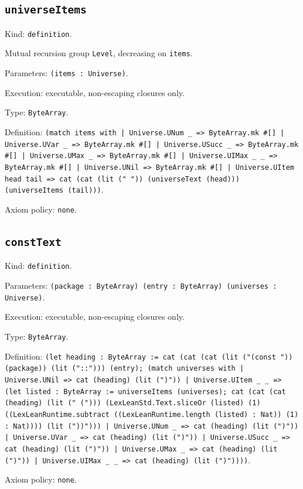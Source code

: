 \documentclass[11pt]{article}
\begin{document}
\subsection*{\texttt{universeItems}}
\noindent Kind: \texttt{definition}.\par
\noindent Mutual recursion group \texttt{Level}, decreasing on \texttt{items}.\par
\noindent Parameters: \texttt{(items : Universe)}.\par
\noindent Execution: executable, non-escaping closures only.\par
\noindent Type: \texttt{ByteArray}.\par
\noindent Definition: \texttt{(match items with | Universe.UNum \_ => ByteArray.mk \#[] | Universe.UVar \_ => ByteArray.mk \#[] | Universe.USucc \_ => ByteArray.mk \#[] | Universe.UMax \_ => ByteArray.mk \#[] | Universe.UIMax \_ \_ => ByteArray.mk \#[] | Universe.UNil => ByteArray.mk \#[] | Universe.UItem head tail => cat (cat (lit (" ")) (universeText (head))) (universeItems (tail)))}.\par
\noindent Axiom policy: \texttt{none}.\par
\subsection*{\texttt{constText}}
\noindent Kind: \texttt{definition}.\par
\noindent Parameters: \texttt{(package : ByteArray) (entry : ByteArray) (universes : Universe)}.\par
\noindent Execution: executable, non-escaping closures only.\par
\noindent Type: \texttt{ByteArray}.\par
\noindent Definition: \texttt{(let heading : ByteArray := cat (cat (cat (lit ("(const ")) (package)) (lit ("::"))) (entry); (match universes with | Universe.UNil => cat (heading) (lit (")")) | Universe.UItem \_ \_ => (let listed : ByteArray := universeItems (universes); cat (cat (cat (heading) (lit (" ("))) (LexLeanStd.Text.sliceOr (listed) (1) ((LexLeanRuntime.subtract ((LexLeanRuntime.length (listed) : Nat)) (1) : Nat)))) (lit ("))"))) | Universe.UNum \_ => cat (heading) (lit (")")) | Universe.UVar \_ => cat (heading) (lit (")")) | Universe.USucc \_ => cat (heading) (lit (")")) | Universe.UMax \_ => cat (heading) (lit (")")) | Universe.UIMax \_ \_ => cat (heading) (lit (")"))))}.\par
\noindent Axiom policy: \texttt{none}.\par
\end{document}

